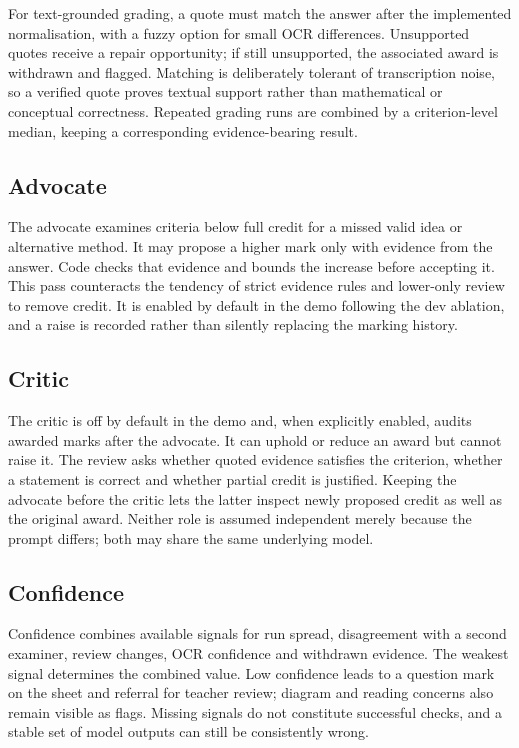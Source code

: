 For text-grounded grading, a quote must match the answer after the implemented normalisation, with a fuzzy option for small OCR differences. Unsupported quotes receive a repair opportunity; if still unsupported, the associated award is withdrawn and flagged. Matching is deliberately tolerant of transcription noise, so a verified quote proves textual support rather than mathematical or conceptual correctness. Repeated grading runs are combined by a criterion-level median, keeping a corresponding evidence-bearing result.

\subsection{Advocate}
The advocate examines criteria below full credit for a missed valid idea or alternative method. It may propose a higher mark only with evidence from the answer. Code checks that evidence and bounds the increase before accepting it. This pass counteracts the tendency of strict evidence rules and lower-only review to remove credit. It is enabled by default in the demo following the dev ablation, and a raise is recorded rather than silently replacing the marking history.

\subsection{Critic}
The critic is off by default in the demo and, when explicitly enabled, audits awarded marks after the advocate. It can uphold or reduce an award but cannot raise it. The review asks whether quoted evidence satisfies the criterion, whether a statement is correct and whether partial credit is justified. Keeping the advocate before the critic lets the latter inspect newly proposed credit as well as the original award. Neither role is assumed independent merely because the prompt differs; both may share the same underlying model.

\subsection{Confidence}
Confidence combines available signals for run spread, disagreement with a second examiner, review changes, OCR confidence and withdrawn evidence. The weakest signal determines the combined value. Low confidence leads to a question mark on the sheet and referral for teacher review; diagram and reading concerns also remain visible as flags. Missing signals do not constitute successful checks, and a stable set of model outputs can still be consistently wrong.

